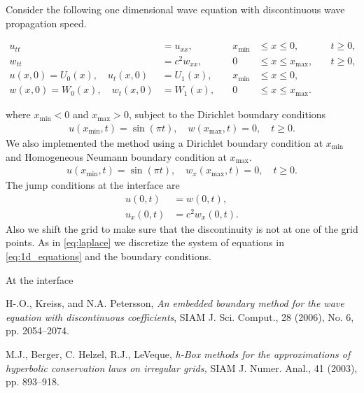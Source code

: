 \documentclass[10pt,a4paper,twoside, french]{article}
\numberwithin{equation}{section}
\numberwithin{figure}{section}
\numberwithin{table}{section}
\begin{document}
Consider the following one dimensional wave equation with discontinuous wave propagation speed. 
\begin{center}
\begin{minipage}[c]{.7\textwidth}
\begin{align}
u_{tt} &= u_{xx}, \quad &x_{\min}&\leq x\leq 0, \quad &t\geq0,\\
w_{tt} &= c^2w_{xx}, \quad &0&\leq x\leq x_{\max}, \quad &t\geq0,\\
u(x,0) = U_0(x), \quad u_t(x,0) &= U_1(x), \quad &x_{\min}&\leq x\leq 0,\\
w(x,0) = W_0(x), \quad w_t(x,0) &= W_1(x), \quad &0&\leq x\leq x_{\max}.
\label{eq:1d_equations}
\end{align}
\end{minipage}
\end{center}

where $x_{\min}<0$ and $x_{\max}>0$, subject to the Dirichlet boundary conditions
\begin{align}
u(x_{\min},t) = \sin(\pi t), \quad w(x_{\max},t) = 0, \quad t\geq 0.
\label{eq:1d_bc_1}
\end{align}
We also implemented the method using a Dirichlet boundary condition at $x_{\min}$ and Homogeneous Neumann boundary condition at $x_{\max}$. 
\begin{align}
u(x_{\min},t) = \sin(\pi t), \quad w_x(x_{\max},t) = 0, \quad t\geq 0.
\label{eq:1d_bc_2}
\end{align}
The jump conditions at the interface are
\begin{align}
u(0,t) &= w(0,t), \nonumber \\
u_x(0,t) &= c^2w_x(0,t).
\label{eq:1d_jump}
\end{align}
Also we shift the grid to make sure that the discontinuity is not at one of the grid points. As in \eqref{eq:laplace} we discretize the system of equations in \eqref{eq:1d_equations} and the  boundary conditions.

At the interface












\begin{thebibliography}{0}

H-.O., Kreiss, and N.A. Petersson,
\emph{An embedded boundary method for the wave equation with discontinuous coefficients},
SIAM J. Sci. Comput., 28 (2006), No. 6, pp. 2054--2074.

M.J., Berger, C. Helzel, R.J., LeVeque,
\emph{h-Box methods for the approximations of hyperbolic conservation laws on irregular grids,}
SIAM J. Numer. Anal., 41 (2003), pp. 893--918.


\end{thebibliography}	
	
\end{document}
